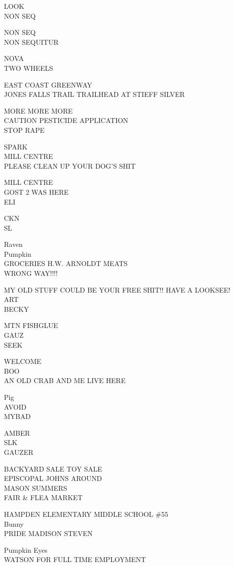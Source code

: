 \documentclass[10pt,letterpaper]{article}
\begin{document}
LOOK\\
NON SEQ

NON SEQ\\
NON SEQUITUR

NOVA\\
TWO WHEELS

EAST COAST GREENWAY\\
JONES FALLS TRAIL TRAILHEAD AT STIEFF SILVER

MORE MORE MORE\\
CAUTION PESTICIDE APPLICATION\\
STOP RAPE

SPARK\\
MILL CENTRE\\
PLEASE CLEAN UP YOUR DOG'S SHIT

MILL CENTRE\\
GOST 2 WAS HERE\\
ELI

CKN\\
SL

Raven\\
Pumpkin\\
GROCERIES H.W. ARNOLDT MEATS\\
WRONG WAY!!!!

MY OLD STUFF COULD BE YOUR FREE SHIT!! HAVE A LOOKSEE!\\
ART\\
BECKY

MTN FISHGLUE\\
GAUZ\\
SEEK

WELCOME\\
BOO\\
AN OLD CRAB AND ME LIVE HERE

Pig\\
AVOID\\
MYBAD

AMBER\\
SLK\\
GAUZER

BACKYARD SALE TOY SALE\\
EPISCOPAL JOHNS AROUND\\
MASON SUMMERS\\
FAIR \& FLEA MARKET

HAMPDEN ELEMENTARY MIDDLE SCHOOL \#55\\
Bunny\\
PRIDE MADISON STEVEN

Pumpkin Eyes\\
WATSON FOR FULL TIME EMPLOYMENT
\end{document}
